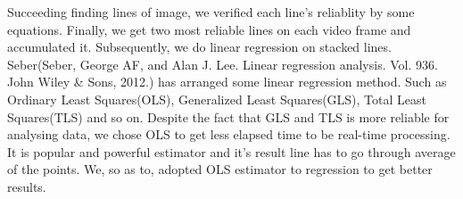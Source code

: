 Succeeding finding lines of image, we verified each line's reliablity by some equations. \newline
Finally, we get two most reliable lines on each video frame and accumulated it. Subsequently, we do linear regression on stacked lines. Seber(Seber, George AF, and Alan J. Lee. Linear regression analysis. Vol. 936. John Wiley \& Sons, 2012.) has arranged some linear regression method. Such as Ordinary Least Squares(OLS), Generalized Least Squares(GLS), Total Least Squares(TLS) and so on. Despite the fact that GLS and TLS is more reliable for analysing data, we chose OLS to get less elapsed time to be real-time processing. It is popular and powerful estimator and it's result line has to go through average of the points. We, so as to, adopted OLS estimator to regression to get better results. 